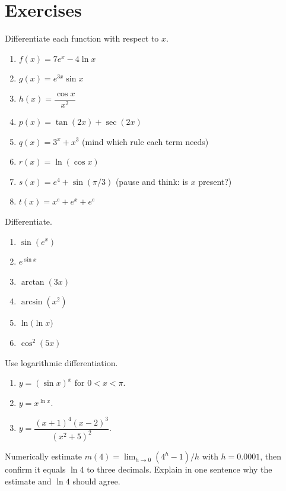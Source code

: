 \section{Exercises}
\label{ch12:exercises}

\begin{exercise}
\label{ch12:exr-warmup}
Differentiate each function with respect to $x$.
\begin{enumerate}[label=(\alph*)]
\item $f(x) = 7e^x - 4\ln x$
\item $g(x) = e^{3x}\sin x$
\item $h(x) = \dfrac{\cos x}{x^2}$
\item $p(x) = \tan(2x) + \sec(2x)$
\item $q(x) = 3^x + x^3$ (mind which rule each term needs)
\item $r(x) = \ln(\cos x)$
\item $s(x) = e^4 + \sin(\pi/3)$ (pause and think: is $x$ present?)
\item $t(x) = x^e + e^x + e^e$
\end{enumerate}
\end{exercise}

\begin{exercise}
\label{ch12:exr-chain}
Differentiate.
\begin{enumerate}[label=(\alph*)]
\item $\sin(e^x)$
\item $e^{\sin x}$
\item $\arctan(3x)$
\item $\arcsin(x^2)$
\item $\ln\!\big(\ln x\big)$
\item $\cos^2(5x)$
\end{enumerate}
\end{exercise}

\begin{exercise}
\label{ch12:exr-logdiff}
Use logarithmic differentiation.
\begin{enumerate}[label=(\alph*)]
\item $y = (\sin x)^x$ for $0<x<\pi$.
\item $y = x^{\ln x}$.
\item $y = \dfrac{(x+1)^4 (x-2)^3}{(x^2+5)^2}$.
\end{enumerate}
\end{exercise}

\begin{exercise}
\label{ch12:exr-base}
Numerically estimate $m(4)=\lim_{h\to0}(4^h-1)/h$ with $h=0.0001$, then
confirm it equals $\ln 4$ to three decimals. Explain in one sentence why the
estimate and $\ln 4$ should agree.
\end{exercise}

